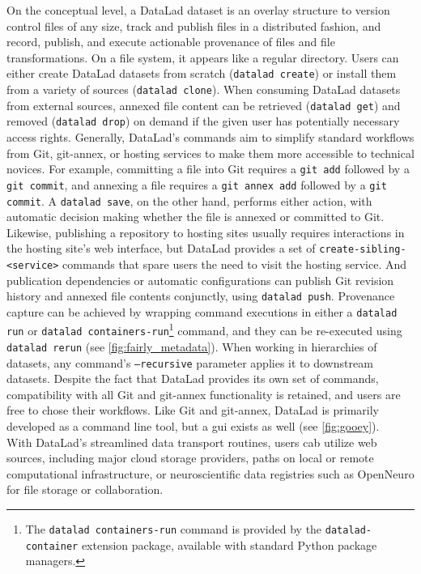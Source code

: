 {On the conceptual level, a DataLad dataset is an overlay structure to version control files of any size, track and publish files in a distributed fashion, and record, publish, and execute actionable provenance of files and file
transformations.
On a file system, it appears like a regular directory.
Users can either create DataLad datasets from scratch (\texttt{datalad create}) or install them from a variety of sources (\texttt{datalad clone}).
When consuming DataLad datasets from external sources, annexed file content can be retrieved (\texttt{datalad get}) and removed (\texttt{datalad drop}) on demand if the given user has potentially necessary access rights.
Generally, DataLad's commands aim to simplify standard workflows from Git, git-annex, or hosting services to make them more accessible to technical novices.
For example, committing a file into Git requires a \texttt{git add} followed by a \texttt{git commit}, and annexing a file requires a \texttt{git annex add} followed by a \texttt{git commit}.
A \texttt{datalad save}, on the other hand, performs either action, with automatic decision making whether the file is annexed or committed to Git.
Likewise, publishing a repository to hosting sites usually requires interactions in the hosting site's web interface, but DataLad provides a set of \texttt{create-sibling-<service>} commands that spare users the need to visit the hosting service.
And publication dependencies or automatic configurations can publish Git revision history and annexed file contents conjunctly, using \texttt{datalad push}.
Provenance capture can be achieved by wrapping command executions in either a \texttt{datalad run} or \texttt{datalad containers-run}\footnote{The \texttt{datalad containers-run} command is provided by the \texttt{datalad-container} extension package, available with standard Python package managers.} command, and they can be re-executed using \texttt{datalad rerun} (see \cref{fig:fairly_metadata}).
When working in hierarchies of datasets, any command's \texttt{--recursive} parameter applies it to downstream datasets.
Despite the fact that DataLad provides its own set of commands, compatibility with all Git and git-annex functionality is retained, and users are free to chose their workflows.
Like Git and git-annex, DataLad is primarily developed as a command line tool, but a \gls{gui} exists as well (see \cref{fig:gooey}).\\
With DataLad's streamlined data transport routines, users cab utilize web sources, including major cloud storage providers, paths on local or remote computational infrastructure, or neuroscientific data registries such as OpenNeuro \citep{markiewicz2021openneuro} for file storage or collaboration.
}
